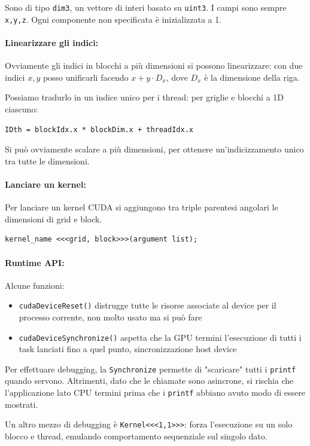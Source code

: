Sono di tipo \texttt{dim3}, un vettore di interi basato su \texttt{uint3}. I campi sono sempre \texttt{x,y,z}. Ogni componente non specificata è inizializzata a 1.

\paragraph{Linearizzare gli indici:} Ovviamente gli indici in blocchi a più dimensioni si possono linearizzare: con due indici $x,y$ posso unificarli facendo $x + y \cdot D_x$, dove $D_x$ è la dimensione della riga.

Possiamo tradurlo in un indice unico per i thread: per griglie e blocchi a 1D ciascuno: 
\begin{center}
	\texttt{IDth = blockIdx.x * blockDim.x + threadIdx.x}
\end{center}
Si può ovviamente scalare a più dimensioni, per ottenere un'indicizzamento unico tra tutte le dimensioni. 

\paragraph{Lanciare un kernel:} Per lanciare un kernel CUDA si aggiungono tra triple parentesi angolari le dimensioni di grid e block.
\begin{verbatim}
kernel_name <<<grid, block>>>(argument list);
\end{verbatim}

\paragraph{Runtime API:} Alcune funzioni:
\begin{itemize}
	\item \texttt{cudaDeviceReset()} distrugge tutte le risorse associate al device per il processo corrente, non molto usato ma si può fare
	
	\item \texttt{cudaDeviceSynchronize()} aspetta che la GPU termini l'esecuzione di tutti i task lanciati fino a quel punto, sincronizzazione host device
\end{itemize}

Per effettuare debugging, la \texttt{Synchronize} permette di "scaricare" tutti i \texttt{printf} quando servono. Altrimenti, dato che le chiamate sono asincrone, si rischia che l'applicazione lato CPU termini prima che i \texttt{printf} abbiano avuto modo di essere mostrati.

Un altro mezzo di debugging è \texttt{Kernel<<<1,1>>>}: forza l'esecuzione su un solo blocco e thread, emulando comportamento sequenziale sul singolo dato.

